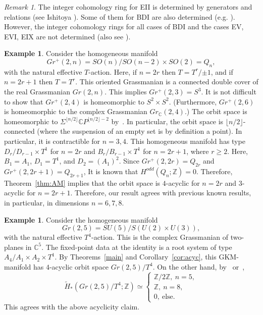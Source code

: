 \documentclass{amsart}
\theoremstyle{definition}
\newtheorem{example}[theorem]{Example}
\theoremstyle{remark}
\newtheorem{remark}[theorem]{Remark}
\numberwithin{equation}{section}
\newcommand{\C}{{\mathbb{C}}}
\newcommand{\Z}{{\mathbb{Z}}}
\begin{document}
\begin{remark}
The integer cohomology ring for EII is determined by generators and relations (see Ishitoya \cite{Ish}). 
Some of them for BDI are also determined (e.g. \cite{Jo}).
However, the integer cohomology rings for all cases of BDI and the cases EV, EVI, EIX are not determined (also see \cite{Na}).
\end{remark}

\begin{example}\label{ex:origra}
Consider the homogeneous manifold
\[
Gr^{+}(2,n)=SO(n)/SO(n-2)\times SO(2)=Q_{n},
\]
with the natural effective $T$-action.
Here, if $n=2r$ then $T=T^{r}/{\pm 1}$, and if $n=2r+1$ then $T=T^{r}$.
This oriented Grassmanian is a connected double cover of the real Grassmanian $Gr(2,n)$.
This implies $Gr^{+}(2,3)=S^3$.
It is not difficult to show that $Gr^+(2,4)$ is homeomorphic to $S^2\times S^2$.
(Furthermore, $Gr^+(2,6)$ is homeomorphic to the complex Grassmanian $Gr_{\C}(2,4)$.)
The orbit space is homeomorphic to $\Sigma^{\lfloor n/2\rfloor} \C P^{\lfloor n/2\rfloor-2}$ by~\cite{S19}.
In particular, the orbit space is ${\lfloor n/2\rfloor}$-connected (where the suspension of an empty set is by definition a point).
In particular, it is contractible for $n=3,4$.
This homogeneous manifold has type $D_{r}/D_{r-1}\times T^{1}$ for $n=2r$ and $B_{r}/B_{r-1}\times T^1$ for $n=2r+1$, where $r\geq 2$.
Here, $B_1=A_1$, $D_1=T^{1}$, and $D_2=(A_1)^2$.
Since $Gr^{+}(2,2r)=Q_{2r}$ and $Gr^{+}(2,2r+1)=Q_{2r+1}$, 
It is known that $H^{odd}(Q_{n};\mathbb{Z})=0$.
Therefore, Theorem~\ref{thm:AM} implies that the orbit space is $4$-acyclic for $n=2r$ and $3$-acyclic for $n=2r+1$.
Therefore, our result agrees with previous known results, in particular, in dimensions $n=6,7,8$.
\end{example}

\begin{example}\label{ex:comgra}
Consider the homogeneous manifold
\[
Gr(2,5)=SU(5)/S(U(2)\times U(3)),
\]
with the natural effective $T^{4}$-action.
This is the complex Grassmanian of two-planes in $\C^5$.
The fixed-point data at the identity is a root system of type $A_{4}/A_{1}\times A_{2}\times T^{1}$.
By Theorems~\ref{main} and Corollary~\ref{cor:acyc},
this GKM-manifold has $4$-acyclic orbit space $Gr(2,5)/T^4$.
On the other hand, by~\cite{BT} or~\cite{S21},
\[
\widetilde{H}_{*}(Gr(2,5)/T^4;\Z)\simeq
\begin{cases}
\Z/2\Z,\ n=5,\\
\Z,\ n=8,\\
0,\ \mbox{else}.
\end{cases}
\]
This agrees with the above acyclicity claim.
\end{example}
\end{document}
